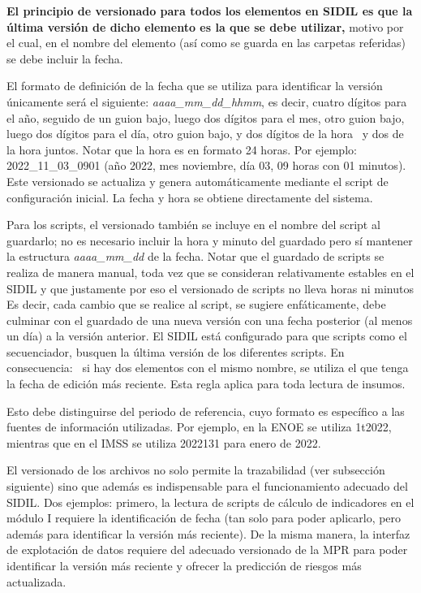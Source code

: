 \documentclass[
]{article}
\begin{document}
\begin{rmdcomment}
\textbf{El principio de versionado para todos los elementos en SIDIL es
que la última versión de dicho elemento es la que se debe utilizar,}
motivo por el cual, en el nombre del elemento (así como se guarda en las
carpetas referidas) se debe incluir la fecha.

El formato de definición de la fecha que se utiliza para identificar la
versión únicamente será el siguiente: \emph{aaaa\_mm\_dd\_hhmm}, es
decir, cuatro dígitos para el año, seguido de un guion bajo, luego dos
dígitos para el mes, otro guion bajo, luego dos dígitos para el día,
otro guion bajo, y dos dígitos de la hora~ y dos de la hora juntos.
Notar que la hora es en formato 24 horas. Por ejemplo:
2022\_11\_03\_0901 (año 2022, mes noviembre, día 03, 09 horas con 01
minutos). Este versionado se actualiza y genera automáticamente mediante
el script de configuración inicial. La fecha y hora se obtiene
directamente del sistema.

Para los scripts, el versionado también se incluye en el nombre del
script al guardarlo; no es necesario incluir la hora y minuto del
guardado pero sí mantener la estructura \emph{aaaa\_mm\_dd} de la fecha.
Notar que el guardado de scripts se realiza de manera manual, toda vez
que se consideran relativamente estables en el SIDIL y que justamente
por eso el versionado de scripts no lleva horas ni minutos Es decir,
cada cambio que se realice al script, se sugiere enfáticamente, debe
culminar con el guardado de una nueva versión con una fecha posterior
(al menos un día) a la versión anterior. El SIDIL está configurado para
que scripts como el secuenciador, busquen la última versión de los
diferentes scripts. En consecuencia:~ si hay dos elementos con el mismo
nombre, se utiliza el que tenga la fecha de edición más reciente. Esta
regla aplica para toda lectura de insumos.

Esto debe distinguirse del periodo de referencia, cuyo formato es
específico a las fuentes de información utilizadas. Por ejemplo, en la
ENOE se utiliza 1t2022, mientras que en el IMSS se utiliza 2022131 para
enero de 2022.
\end{rmdcomment}

El versionado de los archivos no solo permite la trazabilidad (ver subsección siguiente) sino que además es indispensable para el funcionamiento adecuado del SIDIL. Dos ejemplos: primero, la lectura de scripts de cálculo de indicadores en el módulo I requiere la identificación de fecha (tan solo para poder aplicarlo, pero además para identificar la versión más reciente). De la misma manera, la interfaz de explotación de datos requiere del adecuado versionado de la MPR para poder identificar la versión más reciente y ofrecer la predicción de riesgos más actualizada.
\end{document}

